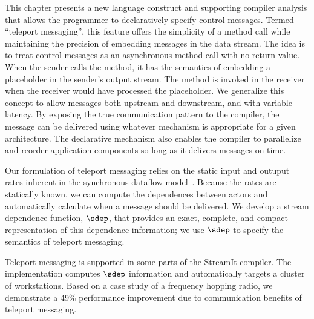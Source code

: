 This chapter presents a new language construct and supporting compiler
analysis that allows the programmer to declaratively specify control
messages.  Termed ``teleport messaging'', this feature offers the
simplicity of a method call while maintaining the precision of
embedding messages in the data stream.  The idea is to treat control
messages as an asynchronous method call with no return value.  When
the sender calls the method, it has the semantics of embedding a
placeholder in the sender's output stream.  The method is invoked in
the receiver when the receiver would have processed the placeholder.
We generalize this concept to allow messages both upstream and
downstream, and with variable latency.  By exposing the true
communication pattern to the compiler, the message can be delivered
using whatever mechanism is appropriate for a given architecture.  The
declarative mechanism also enables the compiler to parallelize and
reorder application components so long as it delivers messages on
time.

Our formulation of teleport messaging relies on the static input and
outuput rates inherent in the synchronous dataflow
model~\cite{LM87-i}.  Because the rates are statically known, we can
compute the dependences between actors and automatically calculate
when a message should be delivered.  We develop a stream dependence
function, $\sdep$, that provides an exact, complete, and compact
representation of this dependence information; we use $\sdep$ to
specify the semantics of teleport messaging.

Teleport messaging is supported in some parts of the StreamIt
compiler.  The implementation computes $\sdep$ information and
automatically targets a cluster of workstations.  Based on a case
study of a frequency hopping radio, we demonstrate a 49\% performance
improvement due to communication benefits of teleport messaging.



